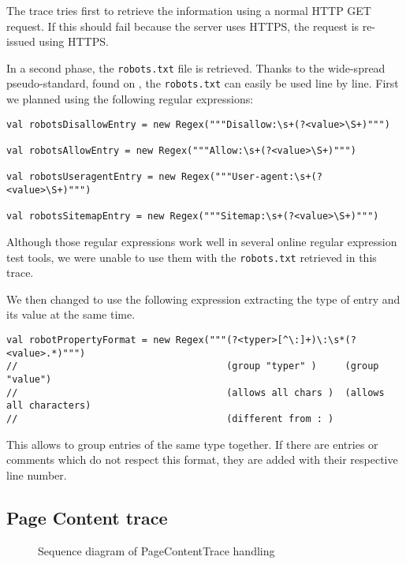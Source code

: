\documentclass[
	a4paper,					10pt,							twoside,					openright,				notitlepage,			parskip=half,			]{scrreprt}
\begin{document}
The trace tries first to retrieve the information using a normal \gls{HTTP} GET request. 
If this should fail because the server uses \gls{HTTPS}, the request is re-issued using \gls{HTTPS}. 

In a second phase, the \verb|robots.txt| file is retrieved. Thanks to the wide-spread pseudo-standard, found 
on \cite{robots:nutshell}, the \verb|robots.txt| can easily be used line by line. 
First we planned using the following regular expressions:

\begin{lstlisting}[language={}]
val robotsDisallowEntry = new Regex("""Disallow:\s+(?<value>\S+)""")

val robotsAllowEntry = new Regex("""Allow:\s+(?<value>\S+)""")

val robotsUseragentEntry = new Regex("""User-agent:\s+(?<value>\S+)""")

val robotsSitemapEntry = new Regex("""Sitemap:\s+(?<value>\S+)""")

\end{lstlisting}

Although those regular expressions work well in several online regular expression test tools, we were unable 
to use them with the \verb|robots.txt| retrieved in this trace. 

We then changed to use the following expression extracting the type of entry and its
value at the same time. 

\begin{lstlisting}[language={}]
val robotPropertyFormat = new Regex("""(?<typer>[^\:]+)\:\s*(?<value>.*)""")
//                                     (group "typer" )     (group "value")
//                                     (allows all chars )  (allows all characters)
//                                     (different from : )

\end{lstlisting}

This allows to group entries of the same type together. If there
are entries or comments which do not respect this format, 
they are added with their respective line number.

\subsection{Page Content trace}
\label{subsec:api_libstruct_pagecontent}

\begin{figure}[H] 
\caption{Sequence diagram of PageContentTrace handling}
\label{fig:seq-pagecontenttrace}
\end{figure}
\end{document}
